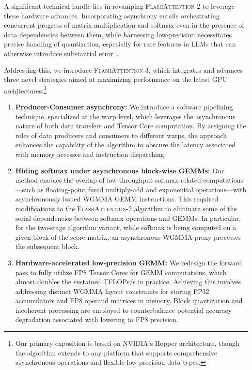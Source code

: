 A significant technical hurdle lies in revamping \textsc{FlashAttention-2} to leverage these hardware advances. Incorporating asynchrony entails orchestrating concurrent progress of matrix multiplication and softmax even in the presence of data dependencies between them, while harnessing low-precision necessitates precise handling of quantization, especially for rare features in LLMs that can otherwise introduce substantial error~\citep{dettmers2208llm, sun2024massive}.

Addressing this, we introduce \textsc{FlashAttention-3}, which integrates and advances three novel strategies aimed at maximizing performance on the latest GPU architectures:\footnote{Our primary exposition is based on NVIDIA’s Hopper architecture, though the algorithm extends to any platform that supports comprehensive asynchronous operations and flexible low-precision data types.}

\begin{enumerate}

\item \textbf{Producer-Consumer asynchrony:} We introduce a software pipelining technique, specialized at the warp level, which leverages the asynchronous nature of both data transfers and Tensor Core computation. By assigning the roles of data producers and consumers to different warps, the approach enhances the capability of the algorithm to obscure the latency associated with memory accesses and instruction dispatching.
\item \textbf{Hiding softmax under asynchronous block-wise GEMMs:} Our method enables the overlap of low-throughput softmax-related computations—such as floating-point fused multiply-add and exponential operations—with asynchronously issued WGMMA GEMM instructions. This required modifications to the \textsc{FlashAttention-2} algorithm to eliminate some of the serial dependencies between softmax operations and GEMMs. In particular, for the two-stage algorithm variant, while softmax is being computed on a given block of the score matrix, an asynchronous WGMMA proxy processes the subsequent block.
\item \textbf{Hardware-accelerated low-precision GEMM:} We redesign the forward pass to fully utilize FP8 Tensor Cores for GEMM computations, which almost doubles the sustained TFLOPs/s in practice. Achieving this involves addressing distinct WGMMA layout constraints for storing FP32 accumulators and FP8 operand matrices in memory. Block quantization and incoherent processing are employed to counterbalance potential accuracy degradation associated with lowering to FP8 precision.
\end{enumerate}

